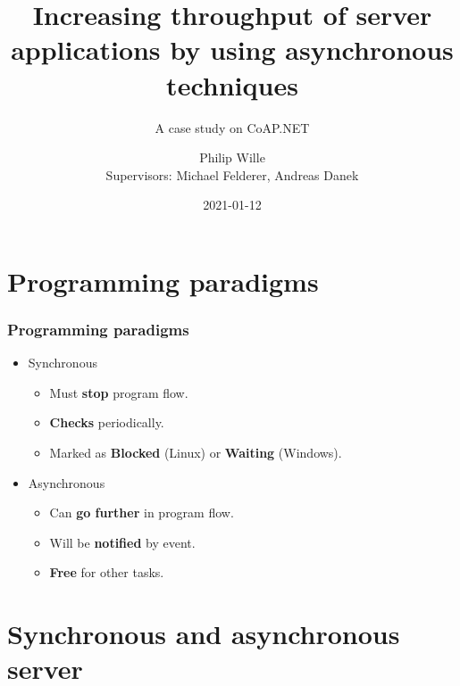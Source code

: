 \documentclass[11pt,t,usepdftitle=false,aspectratio=169,usenames,dvipsnames]{beamer}
\title[Initial presentation CoAP.NET]{Increasing throughput of server applications by using asynchronous techniques}
\subtitle{A case study on CoAP.NET}
\author{Philip Wille\\Supervisors: Michael Felderer, Andreas Danek}
\date{2021-01-12}
\begin{document}
    \maketitle
    \begin{frame}
        \vspace*{1cm plus 1fil}
        \tableofcontents
        \vspace*{0cm plus 1fil}
    \end{frame}
    
    \section{Programming paradigms}
    \begin{frame}
        \frametitle{Programming paradigms}
        \begin{itemize}
            \item<1-> Synchronous
            \begin{itemize}
                \item<3-> Must \textcolor{uibkblue}{\textbf{stop}} program flow.
                \item<5-> \textcolor{uibkblue}{\textbf{Checks}} periodically.
                \item<7-> Marked as \textcolor{uibkblue}{\textbf{Blocked}} (Linux) or \textcolor{uibkblue}{\textbf{Waiting}} (Windows).
            \end{itemize}
            \item<2-> Asynchronous
            \begin{itemize}
                \item<4-> Can \textcolor{uibkblue}{\textbf{go further}} in program flow.
                \item<6-> Will be \textcolor{uibkblue}{\textbf{notified}} by event.
                \item<8-> \textcolor{uibkblue}{\textbf{Free}} for other tasks.
            \end{itemize}
        \end{itemize}
    \end{frame}

    \section{Synchronous and asynchronous server}
\end{document}
